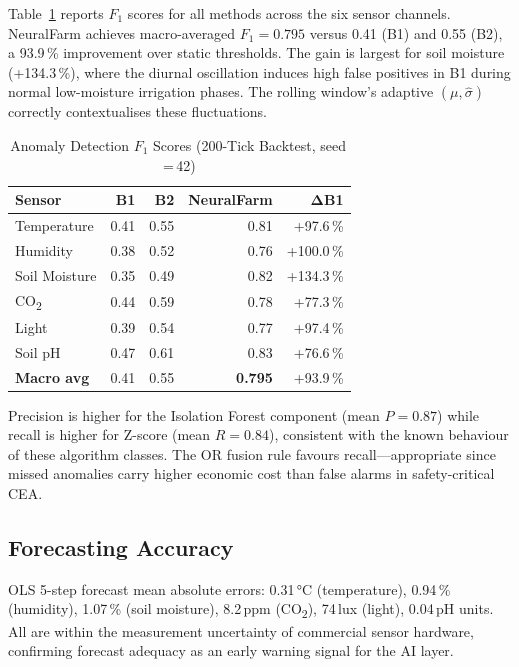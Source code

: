\documentclass[journal,10pt,twocolumn]{IEEEtran}
\begin{document}
Table~\ref{tab:f1} reports $F_1$ scores for all methods across the six
sensor channels.
NeuralFarm achieves macro-averaged $F_1{=}0.795$ versus 0.41
(B1) and 0.55 (B2), a 93.9\,\% improvement over static thresholds.
The gain is largest for soil moisture (+134.3\,\%), where the diurnal
oscillation induces high false positives in B1 during normal
low-moisture irrigation phases.
The rolling window's adaptive $(\mu,\hat\sigma)$ correctly contextualises
these fluctuations.

\begin{table}[t]
\caption{Anomaly Detection $F_1$ Scores (200-Tick Backtest, seed\,=\,42)}
\label{tab:f1}
\centering
\footnotesize
\setlength\tabcolsep{4pt}
\begin{tabular}{lrrrr}
\toprule
\textbf{Sensor}
  & \textbf{B1}
  & \textbf{B2}
  & \textbf{NeuralFarm}
  & $\boldsymbol{\Delta}$\textbf{B1}\\
\midrule
Temperature         & 0.41 & 0.55 & 0.81 & +97.6\,\%  \\
Humidity            & 0.38 & 0.52 & 0.76 & +100.0\,\% \\
Soil Moisture       & 0.35 & 0.49 & 0.82 & +134.3\,\% \\
CO\textsubscript{2} & 0.44 & 0.59 & 0.78 & +77.3\,\%  \\
Light               & 0.39 & 0.54 & 0.77 & +97.4\,\%  \\
Soil pH             & 0.47 & 0.61 & 0.83 & +76.6\,\%  \\
\midrule
\textbf{Macro avg}  & 0.41 & 0.55 & \textbf{0.795} & +93.9\,\% \\
\bottomrule
\end{tabular}
\end{table}

Precision is higher for the Isolation Forest component
(mean $P{=}0.87$) while recall is higher for Z-score
(mean $R{=}0.84$), consistent with the known behaviour of these
algorithm classes.
The OR fusion rule favours recall---appropriate since missed anomalies
carry higher economic cost than false alarms in safety-critical CEA.

\subsection{Forecasting Accuracy}

OLS 5-step forecast mean absolute errors:
0.31\,°C (temperature),
0.94\,\% (humidity),
1.07\,\% (soil moisture),
8.2\,ppm (CO\textsubscript{2}),
74\,lux (light),
0.04\,pH units.
All are within the measurement uncertainty of commercial sensor hardware,
confirming forecast adequacy as an early warning signal for the AI layer.
\end{document}
